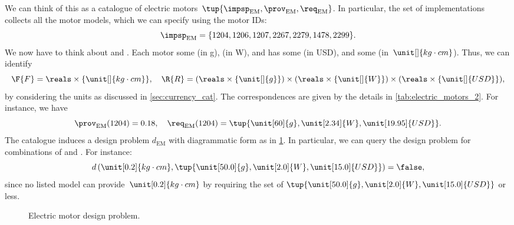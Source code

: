 \begin{example}
  We can think of this as a catalogue of electric motors~$\tup{\impsp_\mathrm{EM},\prov_\mathrm{EM},\req_\mathrm{EM}}$. In particular, the set of implementations collects all the motor models, which we can specify using the motor IDs:
  \begin{equation}
    \impsp_\mathrm{EM}=\{1204,1206,1207,2267,2279,1478,2299 \}.
  \end{equation}
  We now have to think about  and . Each motor  some  (in \unit[]{g}),  (in \unit[]{W}), and has some  (in USD), and  some  (in~$\unit[]{kg\cdot cm}$). Thus, we can identify
  \begin{equation*}
    \F{F}=\reals\times \{\unit[]{kg\cdot cm}\},\quad \R{R}=(\reals\times \{\unit[]{g}\})\times (\reals\times \{\unit[]{W}\})\times (\reals\times \{\unit[]{USD}\}),
  \end{equation*}
  by considering the units as discussed in \cref{sec:currency_cat}. The correspondences are given by the details in \cref{tab:electric_motors_2}. For instance, we have
  \begin{equation}
    \prov_\mathrm{EM}(1204)=0.18, \quad \req_\mathrm{EM}(1204)=\tup{\unit[60]{g},\unit[2.34]{W},\unit[19.95]{USD}}.
  \end{equation}
  The catalogue induces a design problem $d_\mathrm{EM}$ with diagrammatic form as in \cref{fig:dp_em}. In particular, we can query the design problem for combinations of  and . For instance:
  \begin{equation}
    d\left(\unit[0.2]{kg\cdot cm}, \tup{\unit[50.0]{g},\unit[2.0]{W},\unit[15.0]{USD}} \right)=\false,
  \end{equation}
  since no listed model can provide~$\unit[0.2]{kg\cdot cm}$  by requiring the set of  $\tup{\unit[50.0]{g},\unit[2.0]{W},\unit[15.0]{USD}}$ or less.

  \begin{figure}[tbh]
    \begin{center}
    \end{center}
    \caption{Electric motor design problem.}\label{fig:dp_em}
  \end{figure}


\end{example}
